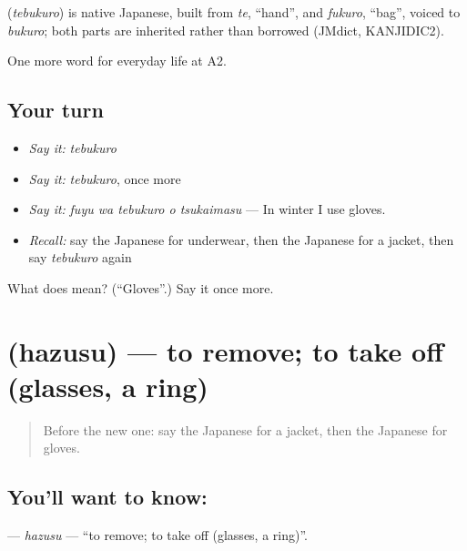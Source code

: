 \begin{cousinweb}
\textbf{} (\emph{tebukuro}) is native Japanese, built from \emph{te}, \textquotedblleft{}hand\textquotedblright{}, and \emph{fukuro}, \textquotedblleft{}bag\textquotedblright{}, voiced to \emph{bukuro}; both parts are inherited rather than borrowed (JMdict, KANJIDIC2).
\end{cousinweb}

\begin{grammarlens}[title={What you've built}]
One more word for everyday life at A2.
\end{grammarlens}

\subsection*{Your turn}
\begin{itemize}
\raggedright
  \item \emph{Say it:} \emph{tebukuro}
  \item \emph{Say it:} \emph{tebukuro}, once more
  \item \emph{Say it:} \emph{fuyu wa tebukuro o tsukaimasu} — In winter I use gloves.
  \item \emph{Recall:} say the Japanese for underwear, then the Japanese for a jacket, then say \emph{tebukuro} again
\end{itemize}

\begin{tcolorbox}[breakable,colback=teal!4,colframe=teal!35!black,title={Before you move on}]
What does  mean? (\textquotedblleft{}Gloves\textquotedblright{}.) Say it once more.
\end{tcolorbox}
\section[\texorpdfstring{\ja{はずす} (hazusu)}{はずす (hazusu)}]{ (hazusu) — to remove; to take off (glasses, a ring)}

\label{lesson:JA-C150-hazusu}



\begin{quote}
Before the new one: say the Japanese for a jacket, then the Japanese for gloves.
\end{quote}

\subsection*{You'll want to know: }
\textbf{} — \emph{hazusu} — \textquotedblleft{}to remove; to take off (glasses, a ring)\textquotedblright{}.


